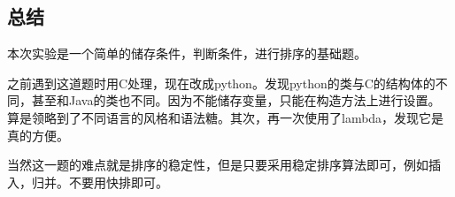 \documentclass[11pt]{article}
\begin{document}
    \hypertarget{ux603bux7ed3}{%
\subsection{总结}\label{ux603bux7ed3}}

本次实验是一个简单的储存条件，判断条件，进行排序的基础题。

之前遇到这道题时用C处理，现在改成python。发现python的类与C的结构体的不同，甚至和Java的类也不同。因为不能储存变量，只能在构造方法上进行设置。
算是领略到了不同语言的风格和语法糖。其次，再一次使用了lambda，发现它是真的方便。

当然这一题的难点就是排序的稳定性，但是只要采用稳定排序算法即可，例如插入，归并。不要用快排即可。


    
    
    
\end{document}
